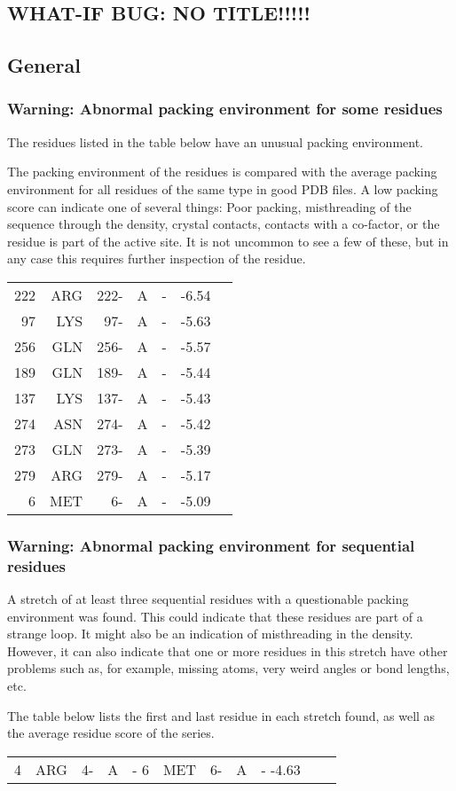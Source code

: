 \documentclass[a4paper]{article}
\def\showsect#1{
  \thesect\gdef\thesect{}
  \thessect\gdef\thessect{}
  \subsubsection{#1}
}
\gdef\thesect{\pagebreak[2]\section{WHAT-IF BUG: NO TITLE!!!!!}}
\gdef\thessect{\subsection{General}}
\begin{document}
\begin{warning}
\showsect{Warning: Abnormal packing environment for some residues}
The residues listed in the table below have an unusual packing environment.
 
The packing environment of the residues is compared with the average packing
environment for all residues of the same type in good PDB files. A low
packing score can indicate one of several things: Poor packing, misthreading
of the sequence through the density, crystal contacts, contacts with a
co-factor, or the residue is part of the active site. It is not uncommon to
see a few of these, but in any case this requires further inspection of the
residue.
 
\begin{center}
 
\begin{supertabular}{rr@{ (}r@{) }rlll}
  222&ARG & 222-&A &-& -6.54\\
   97&LYS &  97-&A &-& -5.63\\
  256&GLN & 256-&A &-& -5.57\\
  189&GLN & 189-&A &-& -5.44\\
  137&LYS & 137-&A &-& -5.43\\
  274&ASN & 274-&A &-& -5.42\\
  273&GLN & 273-&A &-& -5.39\\
  279&ARG & 279-&A &-& -5.17\\
    6&MET &   6-&A &-& -5.09\\
\end{supertabular}\end{center}
\end{warning}

\begin{warning}
\showsect{Warning: Abnormal packing environment for sequential residues}
A stretch of at least three sequential residues with a questionable packing
environment was found. This could indicate that these residues are part
of a strange loop. It might also be an indication of misthreading in the
density. However, it can also indicate that one or more residues in this
stretch have other problems such as, for example, missing atoms, very
weird angles or bond lengths, etc.
 
The table below lists the first and last residue in each stretch found,
as well as the average residue score of the series.
 
\begin{center}
 
\begin{supertabular}{rr@{ (}r@{) }rl@{ --- }rr@{ (}r@{) }rl@{ }r}
    4&ARG &   4-&A &-        6&MET &   6-&A &-       -4.63\\
\end{supertabular}\end{center}
\end{warning}
\end{document}
